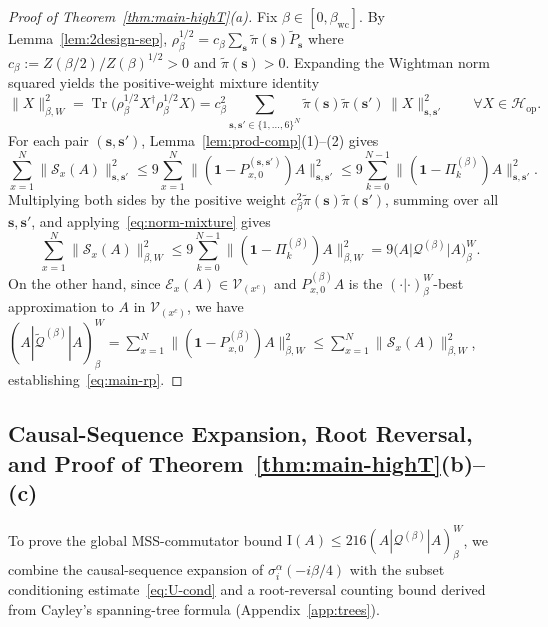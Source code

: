 \documentclass[11pt,a4paper]{article}
\numberwithin{equation}{section}
\theoremstyle{plain}
\theoremstyle{definition}
\newcommand{\Hop}{\mathcal{H}_{\mathrm{op}}}
\newcommand{\Tr}{\operatorname{Tr}}
\begin{document}
\begin{proof}[Proof of Theorem~\ref{thm:main-highT}(a)]
Fix $\beta\in[0,\beta_{\mathrm{wc}}]$. By Lemma~\ref{lem:2design-sep}, $\rho_\beta^{1/2} = c_\beta\sum_{\mathbf{s}}\widetilde{\pi}(\mathbf{s})\widetilde{P}_{\mathbf{s}}$ where $c_\beta := Z(\beta/2)/Z(\beta)^{1/2} > 0$ and $\widetilde{\pi}(\mathbf{s}) > 0$. Expanding the Wightman norm squared yields the positive-weight mixture identity
\begin{equation}\label{eq:norm-mixture}
  \|X\|_{\beta,W}^2 = \Tr\bigl(\rho_\beta^{1/2} X^\dagger \rho_\beta^{1/2} X\bigr)
  = c_\beta^2 \sum_{\mathbf{s},\mathbf{s}'\in\{1,\dots,6\}^N} \widetilde{\pi}(\mathbf{s})\widetilde{\pi}(\mathbf{s}')\,\|X\|_{\mathbf{s},\mathbf{s}'}^2 \qquad \forall X\in\Hop.
\end{equation}
For each pair $(\mathbf{s},\mathbf{s}')$, Lemma~\ref{lem:prod-comp}(1)--(2) gives
\[
  \sum_{x=1}^N \|\mathcal{S}_x(A)\|_{\mathbf{s},\mathbf{s}'}^2
  \le 9\sum_{x=1}^N \bigl\|(\mathbf{1}-P_{x,0}^{(\mathbf{s},\mathbf{s}')})A\bigr\|_{\mathbf{s},\mathbf{s}'}^2
  \le 9\sum_{k=0}^{N-1}\bigl\|(\mathbf{1}-\Pi_k^{(\beta)})A\bigr\|_{\mathbf{s},\mathbf{s}'}^2.
\]
Multiplying both sides by the positive weight $c_\beta^2\widetilde{\pi}(\mathbf{s})\widetilde{\pi}(\mathbf{s}')$, summing over all $\mathbf{s},\mathbf{s}'$, and applying~\eqref{eq:norm-mixture} gives
\[
  \sum_{x=1}^N \|\mathcal{S}_x(A)\|_{\beta,W}^2
  \le 9\sum_{k=0}^{N-1}\bigl\|(\mathbf{1}-\Pi_k^{(\beta)})A\bigr\|_{\beta,W}^2
  = 9\bigl(A\big|\mathcal{Q}^{(\beta)}\big|A\bigr)_\beta^W.
\]
On the other hand, since $\mathcal{E}_x(A)\in\mathcal{V}_{(x^c)}$ and $P_{x,0}^{(\beta)}A$ is the $(\cdot|\cdot)_\beta^W$-best approximation to $A$ in $\mathcal{V}_{(x^c)}$, we have $(A|\widetilde{\mathcal{Q}}^{(\beta)}|A)_\beta^W = \sum_{x=1}^N \|(\mathbf{1}-P_{x,0}^{(\beta)})A\|_{\beta,W}^2 \le \sum_{x=1}^N \|\mathcal{S}_x(A)\|_{\beta,W}^2$, establishing~\eqref{eq:main-rp}.
\end{proof}

\subsection{Causal-Sequence Expansion, Root Reversal, and Proof of Theorem~\ref{thm:main-highT}(b)--(c)}\label{subsec:highT-bc}

To prove the global MSS-commutator bound $\mathrm{I}(A) \le 216(A|\mathcal{Q}^{(\beta)}|A)_\beta^W$, we combine the causal-sequence expansion of $\sigma_i^\alpha(-i\beta/4)$ with the subset conditioning estimate~\eqref{eq:U-cond} and a root-reversal counting bound derived from Cayley's spanning-tree formula (Appendix~\ref{app:trees}).
\end{document}
